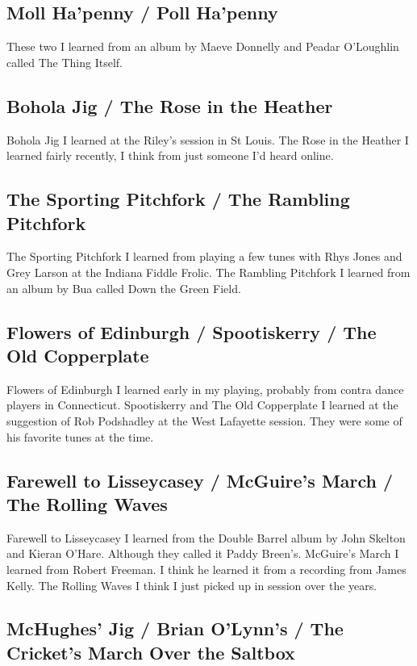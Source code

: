 \documentclass[11pt,letterpaper]{article}
\begin{document}
{\subsection{Moll Ha'penny / Poll Ha'penny}

These two I learned from an album by Maeve Donnelly and Peadar O'Loughlin called The Thing Itself.

\subsection{Bohola Jig / The Rose in the Heather}

Bohola Jig I learned at the Riley's session in St Louis. The Rose in the Heather I learned fairly recently, I think from just someone I'd heard online.

\subsection{The Sporting Pitchfork / The Rambling Pitchfork}

The Sporting Pitchfork I learned from playing a few tunes with Rhys Jones and Grey Larson at the Indiana Fiddle Frolic. The Rambling Pitchfork I learned from an album by Bua called Down the Green Field.

\subsection{Flowers of Edinburgh / Spootiskerry / The Old Copperplate}

Flowers of Edinburgh I learned early in my playing, probably from contra dance players in Connecticut. Spootiskerry and The Old Copperplate I learned at the suggestion of Rob Podshadley at the West Lafayette session. They were some of his favorite tunes at the time.

\subsection{Farewell to Lisseycasey / McGuire's March / The Rolling Waves}

Farewell to Lisseycasey I learned from the Double Barrel album by John Skelton and Kieran O'Hare. Although they called it Paddy Breen's. McGuire's March I learned from Robert Freeman. I think he learned it from a recording from James Kelly. The Rolling Waves I think I just picked up in session over the years. 

\subsection{McHughes' Jig / Brian O'Lynn's / The Cricket's March Over the Saltbox}

}
\end{document}
